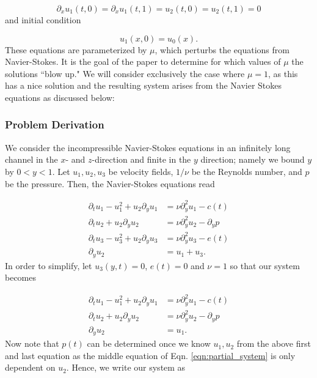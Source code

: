 \documentclass{CUP-JNL-DTM}%
\theoremstyle{definition}
\numberwithin{equation}{section}
\begin{document}
\begin{equation}
    \partial_x u_1(t,0) = \partial_x u_1(t,1) = u_2(t,0) = u_2(t,1) = 0
\end{equation}
and initial condition 

\begin{equation}
    u_1(x,0) = u_0(x).  
\end{equation}
These equations are parameterized by $\mu$, which perturbs the equations from Navier-Stokes. It is the goal of the paper to determine for which values of $\mu$ the solutions ``blow up." We will consider exclusively the case where $\mu = 1$, as this has a nice solution and the resulting system arises from the Navier Stokes equations as discussed below:

\subsubsection{Problem Derivation}

We consider the incompressible Navier-Stokes equations in an infinitely long channel in the $x$- and $z$-direction and finite in the $y$ direction; namely we bound $y$ by $0 < y < 1$. Let $u_1, u_2, u_3$ be velocity fields, $1/\nu$ be the Reynolds number, and $p$ be the pressure. Then, the Navier-Stokes equations read

\begin{equation}
    \begin{split}
        \partial_t u_1 - u_1^2 + u_2\partial_yu_1 & = \nu \partial_y^2 u_1 - c(t) \\
        \partial_t u_2 + u_2 \partial_y u_2 & = \nu \partial_y^2 u_2 - \partial_y p \\
        \partial_t u_3 - u_3^2 + u_2\partial_y u_3 & = \nu \partial_y^2 u_3 - e(t) \\
        \partial_y u_2 & = u_1 + u_3. 
    \end{split}
\end{equation}
In order to simplify, let $u_3(y,t) = 0$, $e(t) = 0$ and $\nu = 1$ so that our system becomes 

\begin{equation}
    \begin{split}
        \partial_t u_1 - u_1^2 + u_2\partial_yu_1 & = \nu \partial_y^2 u_1 - c(t) \\
        \partial_t u_2 + u_2 \partial_y u_2 & = \nu \partial_y^2 u_2 - \partial_y p \\
        \partial_y u_2 & = u_1. 
    \end{split}
\label{eqn:partial_system}
\end{equation}
Now note that $p(t)$ can be determined once we know $u_1, u_2$ from the above first and last equation as the middle equation of Eqn. \ref{eqn:partial_system} is only dependent on $u_2$. Hence, we write our system as 
\end{document}
